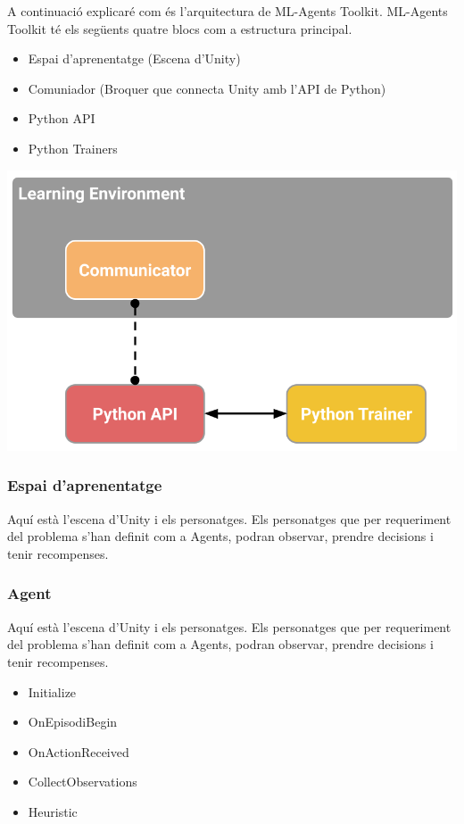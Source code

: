 \documentclass{article}
\begin{document}
    A continuació explicaré com és l'arquitectura de ML-Agents Toolkit. ML-Agents Toolkit té els següents quatre blocs com a estructura principal.
    
    \begin{itemize}
        \item Espai d'aprenentatge (Escena d'Unity)
        \item Comuniador (Broquer que connecta Unity amb l'API de Python)
        \item Python API
        \item Python Trainers
    \end{itemize}

    \includegraphics[width=\textwidth]{images/learning_environment_basic.png}
    
    \newpage
    
    \subsubsection{Espai d'aprenentatge}
    Aquí està l'escena d'Unity i els personatges. Els personatges que per requeriment del problema s'han definit com a Agents, podran observar, prendre decisions i tenir recompenses.
    
    \subsubsection{Agent}
    Aquí està l'escena d'Unity i els personatges. Els personatges que per requeriment del problema s'han definit com a Agents, podran observar, prendre decisions i tenir recompenses.
    \begin{itemize}
        \item Initialize
        \item OnEpisodiBegin
        \item OnActionReceived
        \item CollectObservations
        \item Heuristic
    \end{itemize}
    
\end{document}
